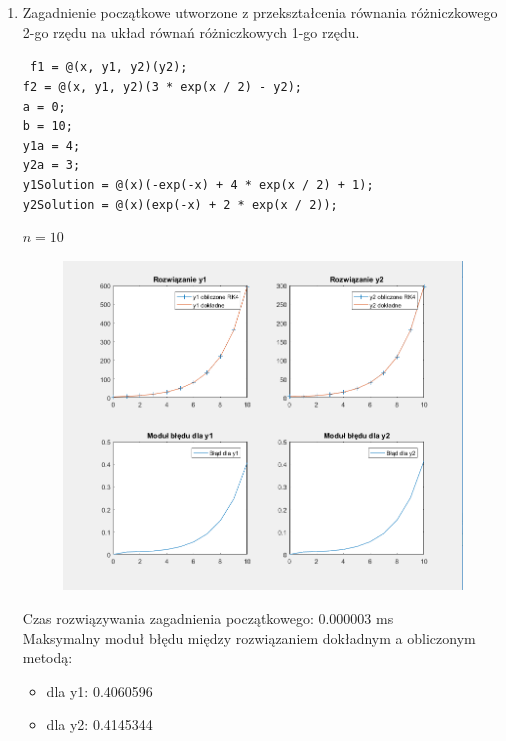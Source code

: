 \documentclass[12pt]{article}
\begin{document}
	\begin{enumerate}[label=\textbf{Przykład \arabic*}]
		\item 
		\label{example-changingN-1}
		Zagadnienie początkowe utworzone z przekształcenia równania różniczkowego 2-go rzędu na układ równań różniczkowych 1-go rzędu.
		
		\texttt{
		f1 = @(x, y1, y2)(y2);	\\
		f2 = @(x, y1, y2)(3 * exp(x / 2) - y2);\\
		a = 0;\\
		b = 10;\\
		y1a = 4;\\
		y2a = 3;\\	
		y1Solution = @(x)(-exp(-x) + 4 * exp(x / 2) + 1); \\
		y2Solution = @(x)(exp(-x) + 2 * exp(x / 2));
		}
	
		$n = 10$
	
		\begin{figure}[H]
			\centering
			\includegraphics[scale=0.7]{images/example-1.png}
		\end{figure}
	
	
		Czas rozwiązywania zagadnienia początkowego: 0.000003 ms\\
		Maksymalny moduł błędu między rozwiązaniem dokładnym a obliczonym metodą:
		\begin{itemize}
			\item dla y1: 0.4060596
			\item dla y2: 0.4145344
		\end{itemize}
	

\end{enumerate}
\end{document}
